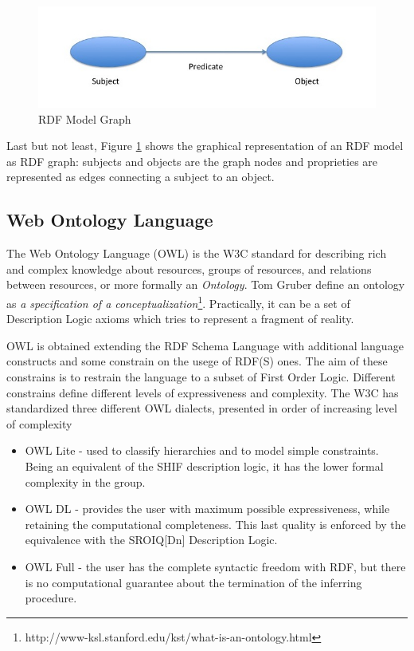 \begin{figure}[tbh]
  \centering
	\includegraphics[width=0.75\linewidth]{images/rdf-graph}
	\caption{RDF Model Graph} 
  	\label{fig:rdf-graph}
\end{figure}

Last but not least, Figure \ref{fig:rdf-graph} shows the graphical representation of an RDF model as RDF graph:  subjects and objects are the graph nodes and proprieties are represented as edges connecting a subject to an object. 




\subsection{Web Ontology Language}\label{sec:owl}

The Web Ontology Language (OWL) is the W3C standard for describing rich and complex knowledge about resources, groups of resources, and relations between resources, or more formally an \textit{Ontology}. Tom Gruber define an ontology as \textit{a specification of a conceptualization}\footnote{http://www-ksl.stanford.edu/kst/what-is-an-ontology.html}. Practically, it can be a set of Description Logic axioms which tries to represent a fragment of reality. 

OWL is obtained extending the RDF Schema Language with additional language constructs and some constrain on the usege of RDF(S)  ones. The aim of these constrains is to restrain the language to a subset of First Order Logic. Different constrains define different levels of expressiveness and complexity. The W3C has standardized three different OWL dialects, presented in order of increasing level of complexity
\begin{itemize}
\item OWL Lite - used to classify hierarchies and to model simple constraints. Being an equivalent of the SHIF description logic, it has the lower formal complexity in the group.
\item OWL DL - provides the user with maximum possible expressiveness, while retaining the computational completeness. This last quality is enforced by the equivalence with the SROIQ[Dn] Description Logic.
\item OWL Full - the user has the complete syntactic freedom with RDF, but there is no computational guarantee about the termination of the inferring procedure.
\end{itemize}

